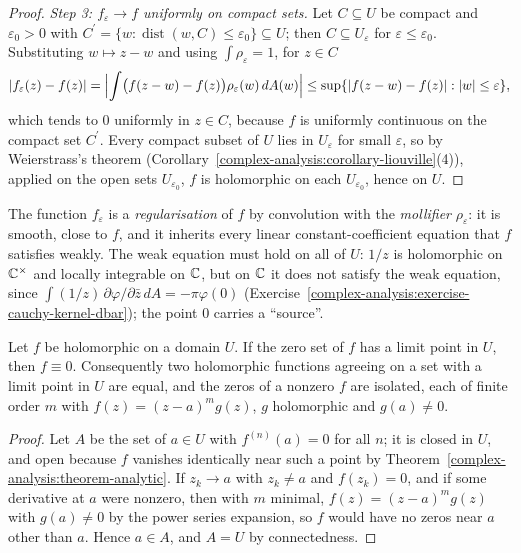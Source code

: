 \begin{proof}
\emph{Step 3: $f_\varepsilon \to f$ uniformly on compact sets.} Let $C \subseteq U$ be compact and $\varepsilon_0 > 0$ with $C^{\prime} = \{w : \operatorname{dist}(w, C) \leq \varepsilon_0\} \subseteq U$; then $C \subseteq U_\varepsilon$
for $\varepsilon \leq \varepsilon_0$. Substituting $w \mapsto z - w$ and using $\int\rho_\varepsilon = 1$, for $z \in C$
\[
|f_\varepsilon(z) - f(z)| = \Bigl|\int\bigl(f(z - w) - f(z)\bigr)\rho_\varepsilon(w)\,dA(w)\Bigr| \leq \sup\{|f(z - w) - f(z)| : |w| \leq \varepsilon\},
\]
which tends to $0$ uniformly in $z \in C$, because $f$ is uniformly continuous on the compact set $C^{\prime}$. Every compact subset of $U$ lies in $U_\varepsilon$ for small $\varepsilon$, so by Weierstrass's theorem
(Corollary~\ref{complex-analysis:corollary-liouville}(4)), applied on the open sets $U_{\varepsilon_0}$, $f$ is holomorphic on each $U_{\varepsilon_0}$, hence on $U$.
\end{proof}

The function $f_\varepsilon$ is a \emph{regularisation} of $f$ by convolution with the \emph{mollifier} $\rho_\varepsilon$: it is smooth, close to $f$, and it inherits every linear constant-coefficient equation that $f$
satisfies weakly. The weak equation must hold on all of $U$: $1/z$ is holomorphic on $\mathbb{C}^\times$ and locally integrable on $\mathbb{C}$, but on $\mathbb{C}$ it does not satisfy the weak equation, since
$\int(1/z)\,\partial\varphi/\partial\bar z\,dA = -\pi\varphi(0)$ (Exercise~\ref{complex-analysis:exercise-cauchy-kernel-dbar}); the point $0$ carries a ``source''.

\begin{theorem}\label{complex-analysis:theorem-identity}
Let $f$ be holomorphic on a domain $U$. If the zero set of $f$ has a limit point in $U$, then $f \equiv 0$. Consequently two holomorphic functions agreeing on a set with a limit point in $U$ are equal, and
the zeros of a nonzero $f$ are isolated, each of finite order $m$ with $f(z) = (z - a)^mg(z)$, $g$ holomorphic and $g(a) \neq 0$.
\end{theorem}

\begin{proof}
Let $A$ be the set of $a \in U$ with $f^{(n)}(a) = 0$ for all $n$; it is closed in $U$, and open because $f$ vanishes identically near such a point by
Theorem~\ref{complex-analysis:theorem-analytic}. If $z_k \to a$ with $z_k \neq a$ and $f(z_k) = 0$, and if some derivative at $a$ were nonzero, then with $m$ minimal, $f(z) = (z - a)^mg(z)$ with $g(a) \neq 0$
by the power series expansion, so $f$ would have no zeros near $a$ other than $a$. Hence $a \in A$, and $A = U$ by connectedness.
\end{proof}

